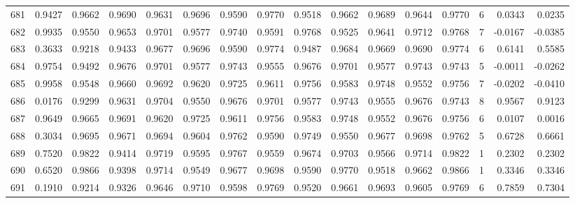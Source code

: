 \begin{tabular}{lrrrrrrrrrrrrrrr}
681 &      0.9427 &  0.9662 &  0.9690 &  0.9631 &  0.9696 &  0.9590 &  0.9770 &  0.9518 &  0.9662 &  0.9689 &   0.9644 &     0.9770 &      6 &                    0.0343 &                     0.0235 \\
682 &      0.9935 &  0.9550 &  0.9653 &  0.9701 &  0.9577 &  0.9740 &  0.9591 &  0.9768 &  0.9525 &  0.9641 &   0.9712 &     0.9768 &      7 &                   -0.0167 &                    -0.0385 \\
683 &      0.3633 &  0.9218 &  0.9433 &  0.9677 &  0.9696 &  0.9590 &  0.9774 &  0.9487 &  0.9684 &  0.9669 &   0.9690 &     0.9774 &      6 &                    0.6141 &                     0.5585 \\
684 &      0.9754 &  0.9492 &  0.9676 &  0.9701 &  0.9577 &  0.9743 &  0.9555 &  0.9676 &  0.9701 &  0.9577 &   0.9743 &     0.9743 &      5 &                   -0.0011 &                    -0.0262 \\
685 &      0.9958 &  0.9548 &  0.9660 &  0.9692 &  0.9620 &  0.9725 &  0.9611 &  0.9756 &  0.9583 &  0.9748 &   0.9552 &     0.9756 &      7 &                   -0.0202 &                    -0.0410 \\
686 &      0.0176 &  0.9299 &  0.9631 &  0.9704 &  0.9550 &  0.9676 &  0.9701 &  0.9577 &  0.9743 &  0.9555 &   0.9676 &     0.9743 &      8 &                    0.9567 &                     0.9123 \\
687 &      0.9649 &  0.9665 &  0.9691 &  0.9620 &  0.9725 &  0.9611 &  0.9756 &  0.9583 &  0.9748 &  0.9552 &   0.9676 &     0.9756 &      6 &                    0.0107 &                     0.0016 \\
688 &      0.3034 &  0.9695 &  0.9671 &  0.9694 &  0.9604 &  0.9762 &  0.9590 &  0.9749 &  0.9550 &  0.9677 &   0.9698 &     0.9762 &      5 &                    0.6728 &                     0.6661 \\
689 &      0.7520 &  0.9822 &  0.9414 &  0.9719 &  0.9595 &  0.9767 &  0.9559 &  0.9674 &  0.9703 &  0.9566 &   0.9714 &     0.9822 &      1 &                    0.2302 &                     0.2302 \\
690 &      0.6520 &  0.9866 &  0.9398 &  0.9714 &  0.9549 &  0.9677 &  0.9698 &  0.9590 &  0.9770 &  0.9518 &   0.9662 &     0.9866 &      1 &                    0.3346 &                     0.3346 \\
691 &      0.1910 &  0.9214 &  0.9326 &  0.9646 &  0.9710 &  0.9598 &  0.9769 &  0.9520 &  0.9661 &  0.9693 &   0.9605 &     0.9769 &      6 &                    0.7859 &                     0.7304 \\

\end{tabular}
